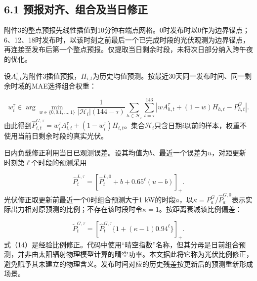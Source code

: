 \documentclass[UTF8,a4paper,zihao=-4,fontset=windows]{ctexart}
\begin{document}
\subsection{6.1 预报对齐、组合及当日修正}
附件3的整点预报先线性插值到10分钟右端点网格。0时发布时以0作为边界锚点；6、12、18时发布时，以该时刻之前最后一个已完成时段的光伏观测为边界锚点，再连接至发布后第一个整点预报。仅提取当日剩余时段，未将次日部分纳入跨午夜的优化。
\par
设$A_{i,t}^{\tau}$为附件3插值预报，$H_{i,t}$为历史均值预测。按最近30天同一发布时间、同一剩余时域的MAE选择组合权重：
\par
\begin{equation}
w_i^{\tau}\in\arg\min_{w\in\{0,0.1,\ldots,1\}}\frac{1}{|\mathcal H_i|(144-\tau)}\sum_{h\in\mathcal H_i}\sum_{t=\tau}^{143}\left|wA_{h,t}^{\tau}+(1-w)H_{h,t}-P^G_{h,t}\right|. \tag{12}
\end{equation}
由此得到$\widehat P_{i,t}^{G,\tau}=w_i^{\tau}A_{i,t}^{\tau}+(1-w_i^{\tau})H_{i,t}$。集合$\mathcal H_i$只含日期$i$以前的样本，权重不使用当前日剩余时段的真实光伏。
\par
日内负载修正利用当日已观测误差。设其均值为$b$、最近一个误差为$u$，对距更新时刻第$\ell$个时段的预测采用
\par
\begin{equation}
\widehat P_{t}^{L,\tau}=\left[\widehat P_t^{L,0}+b+0.65^{\ell}(u-b)\right]_+. \tag{13}
\end{equation}
光伏修正取更新前最近一个0时组合预测大于1 kW的时段$a$，以$\kappa=P^G_a/\widehat P_a^{G,0}$表示实际出力相对原预测的比例；不存在该时段时令$\kappa=1$。按距离衰减该比例偏差：
\par
\begin{equation}
\widetilde P_t^{G,\tau}=\left[\widehat P_t^{G,\tau}\{1+(\kappa-1)0.94^{\ell}\}\right]_+. \tag{14}
\end{equation}
式（14）是经验比例修正。代码中使用“晴空指数”名称，但其分母是日前组合预测，并非由太阳辐射物理模型计算的晴空功率。本文据此将它称为光伏比例修正，避免赋予其未建立的物理含义。发布时间对应的历史残差按更新后的预测重新形成场景。
\par
\end{document}
